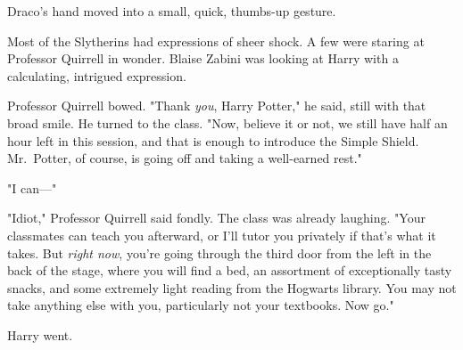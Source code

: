 Draco's hand moved into a small, quick, thumbs-up gesture.

Most of the Slytherins had expressions of sheer shock. A few were staring at 
Professor Quirrell in wonder. Blaise Zabini was looking at Harry with a 
calculating, intrigued expression.

Professor Quirrell bowed. "Thank \emph{you}, Harry Potter," he said, still with 
that broad smile. He turned to the class. "Now, believe it or not, we still 
have half an hour left in this session, and that is enough to introduce the 
Simple Shield. Mr.~Potter, of course, is going off and taking a well-earned 
rest."

"I can---"

"Idiot," Professor Quirrell said fondly. The class was already laughing. "Your 
classmates can teach you afterward, or I'll tutor you privately if that's what 
it takes. But \emph{right now}, you're going through the third door from the 
left in the back of the stage, where you will find a bed, an assortment of 
exceptionally tasty snacks, and some extremely light reading from the Hogwarts 
library. You may not take anything else with you, particularly not your 
textbooks. Now go."

Harry went.
